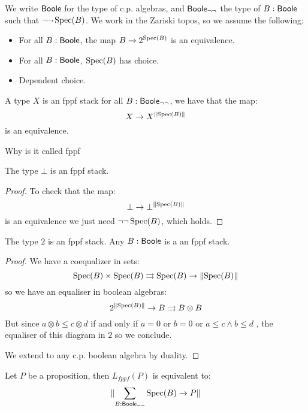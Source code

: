 We write $\mathsf{Boole}$ for the type of c.p. algebras, and $\mathsf{Boole}_{\neg\neg}$ the type of $B:\mathsf{Boole}$ such that $\neg\neg\operatorname{Spec}(B)$. We work in the Zariski topos, so we assume the following:

\begin{itemize}
\item For all $B:\mathsf{Boole}$, the map $B\to {2}^{\operatorname{Spec}(B)}$ is an equivalence.
\item For all $B:\mathsf{Boole}$, $\operatorname{Spec}(B)$ has choice.
\item Dependent choice.
\end{itemize}

\begin{definition}
A type $X$ is an fppf stack for all $B:\mathsf{Boole}_{\neg\neg}$, we have that the map:
\[X\to X^{\lVert \operatorname{Spec}(B) \rVert}\]
is an equivalence.
\end{definition}

\begin{remark}
Why is it called fppf 
\end{remark}

\begin{lemma}\label{bot-stack}
The type $\bot$ is an fppf stack.
\end{lemma}

\begin{proof}
To check that the map:
\[\bot\to \bot^{\lVert \operatorname{Spec}(B) \rVert}\]
is an equivalence we just need $\neg\neg\operatorname{Spec}(B)$, which holds.
\end{proof}

\begin{lemma}\label{fppf-subcanonical}
The type ${2}$ is an fppf stack. Any $B:\mathsf{Boole}$ is a an fppf stack.
\end{lemma}

\begin{proof}
We have a coequalizer in sets:
\[\operatorname{Spec}(B)\times\operatorname{Spec}(B) \rightrightarrows \operatorname{Spec}(B)\to \lVert \operatorname{Spec}(B) \rVert \]
so we have an equaliser in boolean algebras:
\[ {2}^{\lVert \operatorname{Spec}(B) \rVert}\to B\rightrightarrows B\otimes B \]
But since $a\otimes b\leq c\otimes d$ if and only if $a=0$ or $b=0$ or $a\leq c\land b\leq d$ , the equaliser of this diagram in ${2}$ so we conclude.

We extend to any c.p. boolean algebra by duality.
\end{proof}

\begin{lemma}\label{proposition-fppf-stack}
Let $P$ be a proposition, then $L_{fppf}(P)$ is equivalent to:
\[\lVert \sum_{B:\mathsf{Boole}_{\neg\neg}} \operatorname{Spec}(B)\to P \rVert\]
\end{lemma}

